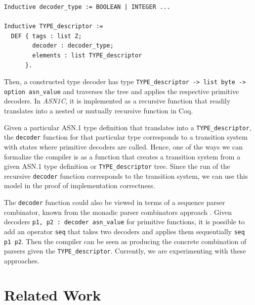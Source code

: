 \documentclass[10p,conference]{IEEEtran}
\begin{document}
 \begin{lstlisting}[language=Coq]
Inductive decoder_type := BOOLEAN | INTEGER ...

Inductive TYPE_descriptor :=
  DEF { tags : list Z;
        decoder : decoder_type;
        elements : list TYPE_descriptor 
      }.
 \end{lstlisting}

 Then, a constructed type decoder has type \lstinline[language=Coq]{TYPE_descriptor -> list byte -> option asn_value} and traverses the tree and applies the respective primitive decoders. In \emph{ASN1C}, it is implemented as
 a recursive function that readily translates into a nested or mutually recursive
 function in Coq.

 Given a particular ASN.1 type definition that translates into a
 \texttt{TYPE\_descriptor}, the \texttt{decoder} function for that
 particular type corresponds to a transition system with states where
 primitive decoders are called. Hence, one of the ways we can
 formalize the compiler is as a function that creates a transition
 system from a given ASN.1 type definition or \texttt{TYPE\_descriptor} tree. Since the run of the
 recursive \texttt{decoder} function corresponds to the transition
 system, we can use this model in the proof of implementation
 correctness.

 The \texttt{decoder} function could also be viewed in terms
 of a sequence parser combinator, known from the monadic parser combinators
 approach \cite{MPC}. Given decoders \lstinline[language=Coq]{p1, p2 : decoder asn_value} for primitive functions, it is possible to add an operator \lstinline[language=Coq]{seq} that takes two
 decoders and applies them sequentially \lstinline[language=Coq]{seq p1 p2}. Then the compiler can be seen as producing the
 concrete combination of parsers given the \texttt{TYPE\_descriptor}. Currently, we are experimenting with these approaches.

\section{Related Work}
\end{document}
